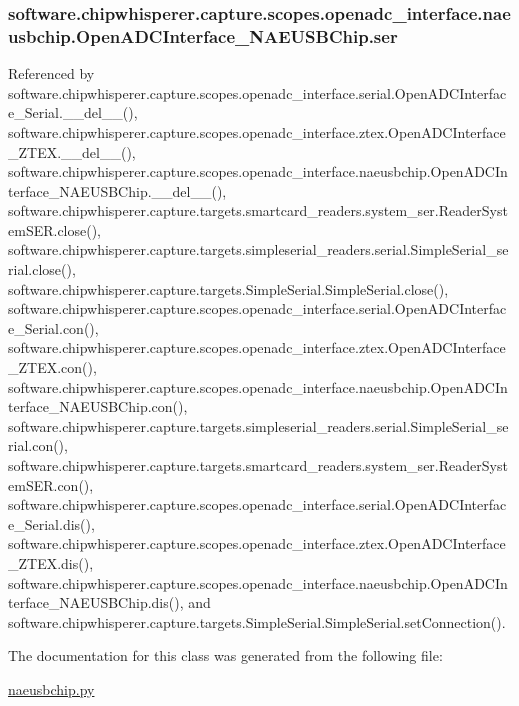 \subsubsection[{ser}]{\setlength{\rightskip}{0pt plus 5cm}software.\+chipwhisperer.\+capture.\+scopes.\+openadc\+\_\+interface.\+naeusbchip.\+Open\+A\+D\+C\+Interface\+\_\+\+N\+A\+E\+U\+S\+B\+Chip.\+ser}\label{classsoftware_1_1chipwhisperer_1_1capture_1_1scopes_1_1openadc__interface_1_1naeusbchip_1_1OpenADCInterface__NAEUSBChip_a8f8c20a3519cfc4cc3150bc890449e0d}


Referenced by software.\+chipwhisperer.\+capture.\+scopes.\+openadc\+\_\+interface.\+serial.\+Open\+A\+D\+C\+Interface\+\_\+\+Serial.\+\_\+\+\_\+del\+\_\+\+\_\+(), software.\+chipwhisperer.\+capture.\+scopes.\+openadc\+\_\+interface.\+ztex.\+Open\+A\+D\+C\+Interface\+\_\+\+Z\+T\+E\+X.\+\_\+\+\_\+del\+\_\+\+\_\+(), software.\+chipwhisperer.\+capture.\+scopes.\+openadc\+\_\+interface.\+naeusbchip.\+Open\+A\+D\+C\+Interface\+\_\+\+N\+A\+E\+U\+S\+B\+Chip.\+\_\+\+\_\+del\+\_\+\+\_\+(), software.\+chipwhisperer.\+capture.\+targets.\+smartcard\+\_\+readers.\+system\+\_\+ser.\+Reader\+System\+S\+E\+R.\+close(), software.\+chipwhisperer.\+capture.\+targets.\+simpleserial\+\_\+readers.\+serial.\+Simple\+Serial\+\_\+serial.\+close(), software.\+chipwhisperer.\+capture.\+targets.\+Simple\+Serial.\+Simple\+Serial.\+close(), software.\+chipwhisperer.\+capture.\+scopes.\+openadc\+\_\+interface.\+serial.\+Open\+A\+D\+C\+Interface\+\_\+\+Serial.\+con(), software.\+chipwhisperer.\+capture.\+scopes.\+openadc\+\_\+interface.\+ztex.\+Open\+A\+D\+C\+Interface\+\_\+\+Z\+T\+E\+X.\+con(), software.\+chipwhisperer.\+capture.\+scopes.\+openadc\+\_\+interface.\+naeusbchip.\+Open\+A\+D\+C\+Interface\+\_\+\+N\+A\+E\+U\+S\+B\+Chip.\+con(), software.\+chipwhisperer.\+capture.\+targets.\+simpleserial\+\_\+readers.\+serial.\+Simple\+Serial\+\_\+serial.\+con(), software.\+chipwhisperer.\+capture.\+targets.\+smartcard\+\_\+readers.\+system\+\_\+ser.\+Reader\+System\+S\+E\+R.\+con(), software.\+chipwhisperer.\+capture.\+scopes.\+openadc\+\_\+interface.\+serial.\+Open\+A\+D\+C\+Interface\+\_\+\+Serial.\+dis(), software.\+chipwhisperer.\+capture.\+scopes.\+openadc\+\_\+interface.\+ztex.\+Open\+A\+D\+C\+Interface\+\_\+\+Z\+T\+E\+X.\+dis(), software.\+chipwhisperer.\+capture.\+scopes.\+openadc\+\_\+interface.\+naeusbchip.\+Open\+A\+D\+C\+Interface\+\_\+\+N\+A\+E\+U\+S\+B\+Chip.\+dis(), and software.\+chipwhisperer.\+capture.\+targets.\+Simple\+Serial.\+Simple\+Serial.\+set\+Connection().



The documentation for this class was generated from the following file\+:\begin{DoxyCompactItemize}
\item 
\hyperlink{naeusbchip_8py}{naeusbchip.\+py}\end{DoxyCompactItemize}
